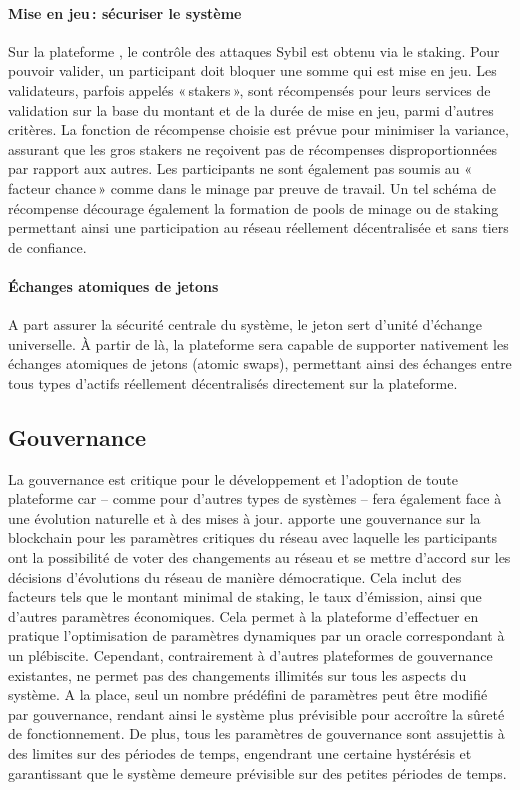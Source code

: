 \documentclass[runningheads,francais,a4paper]{llncs}
\begin{document}
\paragraph{Mise en jeu\,: sécuriser le système}
Sur la plateforme \AVAPlatformName{}, le contrôle des attaques Sybil est obtenu via le staking. Pour pouvoir valider, un
participant doit bloquer une somme qui est mise en jeu. Les validateurs, parfois appelés «\,stakers\,», sont récompensés
pour leurs services de validation sur la base du montant et de la durée de mise en jeu, parmi d'autres critères. La
fonction de récompense choisie est prévue pour minimiser la variance, assurant que les gros stakers ne reçoivent pas de
récompenses disproportionnées par rapport aux autres. Les participants ne sont également pas soumis au
«\,facteur chance\,» comme dans le minage par preuve de travail. Un tel schéma de récompense décourage également la
formation de pools de minage ou de staking permettant ainsi une participation au réseau réellement décentralisée et
sans tiers de confiance.

\paragraph{Échanges atomiques de jetons}
A part assurer la sécurité centrale du système, le jeton \AVATokenName{} sert d'unité d'échange universelle. À
partir de là, la plateforme \AVAPlatformName{} sera capable de supporter nativement les échanges atomiques de jetons (atomic swaps),
permettant ainsi des échanges entre tous types d'actifs réellement décentralisés directement sur la plateforme.

\subsection{Gouvernance}
La gouvernance est critique pour le développement et l'adoption de toute plateforme car -- comme pour d'autres types de
systèmes -- \AVAPlatformName{} fera également face à une évolution naturelle et à des mises à jour. \AVATokenName{}
apporte une gouvernance sur la blockchain pour les paramètres critiques du réseau avec laquelle les participants ont la
possibilité de voter des changements au réseau et se mettre d'accord sur les décisions d'évolutions du réseau de manière
démocratique. Cela inclut des facteurs tels que le montant minimal de staking, le taux d'émission, ainsi que d'autres
paramètres économiques. Cela permet à la plateforme d'effectuer en pratique l'optimisation de paramètres dynamiques 
par un oracle correspondant à un plébiscite. Cependant, contrairement à d'autres plateformes de gouvernance existantes,
\AVAPlatformName{} ne permet pas des changements illimités sur tous les aspects du système. A la place, seul un nombre
prédéfini de paramètres peut être modifié par gouvernance, rendant ainsi le système plus prévisible pour accroître la sûreté de
fonctionnement. De plus, tous les paramètres de gouvernance sont assujettis à des limites sur des périodes de temps,
engendrant une certaine hystérésis et garantissant que le système demeure prévisible sur des petites périodes de temps.
\end{document}
